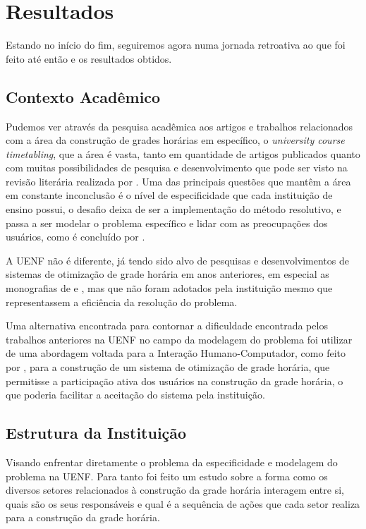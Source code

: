 \chapter{Resultados} \label{chap:resultados} %

Estando no início do fim, seguiremos agora numa jornada retroativa ao que foi feito até então e os resultados obtidos.

\section{Contexto Acadêmico} %

Pudemos ver através da pesquisa acadêmica aos artigos e trabalhos relacionados com a área da construção de grades horárias em específico, o \textit{university course timetabling}, que a área é vasta, tanto em quantidade de artigos publicados quanto com muitas possibilidades de pesquisa e desenvolvimento que pode ser visto na revisão literária realizada por . Uma das principais questões que mantêm a área em constante inconclusão é o nível de especificidade que cada instituição de ensino possui, o desafio deixa de ser a implementação do método resolutivo, e passa a ser modelar o problema específico e lidar com as preocupações dos usuários, como é concluído por .

A UENF não é diferente, já tendo sido alvo de pesquisas e desenvolvimentos de sistemas de otimização de grade horária em anos anteriores, em especial as monografias de  e , mas que não foram adotados pela instituição mesmo que representassem a eficiência da resolução do problema.

Uma alternativa encontrada para contornar a dificuldade encontrada pelos trabalhos anteriores na UENF no campo da modelagem do problema foi utilizar de uma abordagem voltada para a Interação Humano-Computador, como feito por , para a construção de um sistema de otimização de grade horária, que permitisse a participação ativa dos usuários na construção da grade horária, o que poderia facilitar a aceitação do sistema pela instituição.

\section{Estrutura da Instituição}

Visando enfrentar diretamente o problema da especificidade e modelagem do problema na UENF. Para tanto foi feito um estudo sobre a forma como os diversos setores relacionados à construção da grade horária interagem entre si, quais são os seus responsáveis e qual é a sequência de ações que cada setor realiza para a construção da grade horária.

